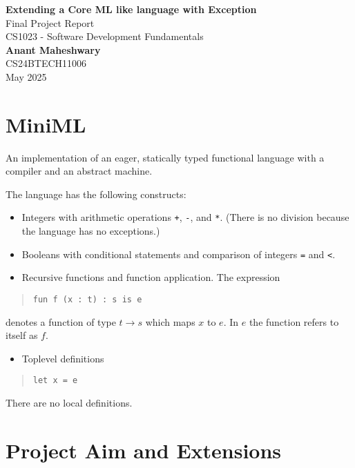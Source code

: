 \documentclass[a4paper,12pt]{article}
\begin{document}
\begin{center}
    {\LARGE \textbf{Extending a Core ML like language with Exception}}\\[1.5cm]
    {\large Final Project Report}\\
    {\large CS1023 - Software Development Fundamentals}\\[1.5cm]
    {\Large \textbf{Anant Maheshwary}}\\
    CS24BTECH11006\\[1.5cm]
    May 2025
\end{center}

\renewcommand{\contentsname}{Contents}
\tableofcontents
\newpage

\section{MiniML}

An implementation of an eager, statically typed functional language with a compiler and an abstract machine.

The language has the following constructs:
\begin{itemize}[left=0.5cm]
    \item Integers with arithmetic operations \texttt{+}, \texttt{-}, and \texttt{*}. (There is no division because the language has no exceptions.)
    \item Booleans with conditional statements and comparison of integers \texttt{=} and \texttt{<}.
    \item Recursive functions and function application. The expression
\end{itemize}

\begin{quote}
\texttt{fun f (x : t) : s is e}
\end{quote}

denotes a function of type $t \rightarrow s$ which maps $x$ to $e$. In $e$ the function refers to itself as $f$.

\begin{itemize}[left=0.5cm]
    \item Toplevel definitions
\end{itemize}

\begin{quote}
\texttt{let x = e}
\end{quote}

There are no local definitions.

\section{Project Aim and Extensions}
\end{document}

